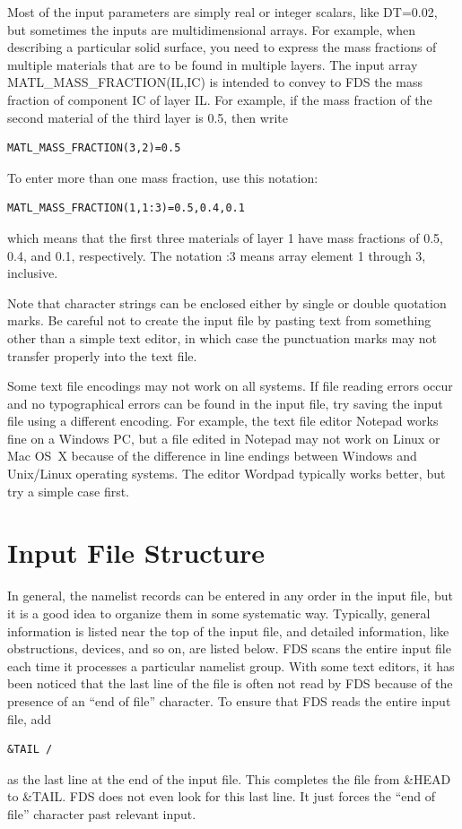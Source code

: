 \documentclass[11pt]{book}
\begin{document}
Most of the input parameters are simply real or integer scalars, like {\ct DT=0.02}, but sometimes the inputs are
multidimensional arrays. For example, when describing a particular solid surface, you need to express the mass fractions of multiple materials that are to be found in multiple layers. The input array {\ct MATL\_MASS\_FRACTION(IL,IC)} is intended to convey to FDS the mass fraction of component {\ct IC} of layer {\ct IL}. For example, if the mass fraction of the second material of the third layer is 0.5, then write
\begin{lstlisting}
MATL_MASS_FRACTION(3,2)=0.5
\end{lstlisting}
To enter more than one mass fraction, use this notation:
\begin{lstlisting}
MATL_MASS_FRACTION(1,1:3)=0.5,0.4,0.1
\end{lstlisting}
which means that the first three materials of layer 1 have mass fractions of 0.5, 0.4, and 0.1, respectively. The notation {:3} means array element 1 through 3, inclusive.

Note that character strings can be enclosed either by single or double quotation marks. Be careful not to create the input file by pasting text from something other than a simple text editor, in which case the punctuation marks may not transfer properly into the text file.

Some text file encodings may not work on all systems. If file reading errors occur and no typographical errors can be found in the input file, try saving the input file using a different encoding. For example, the text file editor Notepad works fine on a Windows PC, but a file edited in Notepad may not work on Linux or Mac OS~X because of the difference in line endings between Windows and Unix/Linux operating systems. The editor Wordpad typically works better, but try a simple case first.


\section{Input File Structure}

In general, the namelist records can be entered in any order in the input file, but it is a good idea to organize them
in some systematic way. Typically, general information is listed near the top of the input file, and detailed information, like
obstructions, devices, and so on, are listed below. FDS scans the entire input file each time it processes a particular namelist group.
With some text editors, it has been noticed that the last line of the file is often not read by FDS because of the presence of an
``end of file'' character.
To ensure that FDS reads the entire input file, add
\begin{lstlisting}
&TAIL /
\end{lstlisting}
as the last line at the end of the input file. This completes the file from {\ct \&HEAD} to {\ct \&TAIL}. FDS does not even look for
this last line. It just forces the ``end of file'' character past relevant input.
\end{document}
